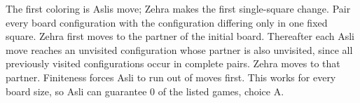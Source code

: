 The first coloring is Asli\textquotesingle s move; Zehra makes the first single-square change. Pair every board configuration with the configuration differing only in one fixed square. Zehra first moves to the partner of the initial board. Thereafter each Asli move reaches an unvisited configuration whose partner is also unvisited, since all previously visited configurations occur in complete pairs. Zehra moves to that partner. Finiteness forces Asli to run out of moves first. This works for every board size, so Asli can guarantee $\boxed{0}$ of the listed games, choice A.
